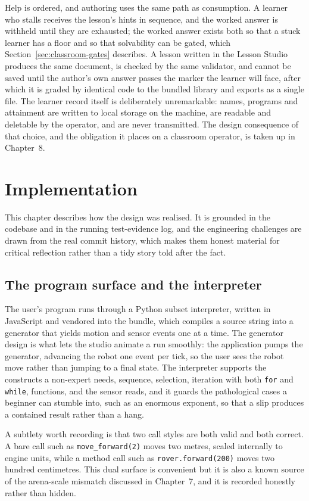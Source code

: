 \documentclass[11pt,a4paper]{report}
\begin{document}
Help is ordered, and authoring uses the same path as consumption. A learner who stalls receives the lesson's hints in sequence, and the worked answer is withheld until they are exhausted; the worked answer exists both so that a stuck learner has a floor and so that solvability can be gated, which Section~\ref{sec:classroom-gates} describes. A lesson written in the Lesson Studio produces the same document, is checked by the same validator, and cannot be saved until the author's own answer passes the marker the learner will face, after which it is graded by identical code to the bundled library and exports as a single file. The learner record itself is deliberately unremarkable: names, programs and attainment are written to local storage on the machine, are readable and deletable by the operator, and are never transmitted. The design consequence of that choice, and the obligation it places on a classroom operator, is taken up in Chapter~8.

\chapter{Implementation}

This chapter describes how the design was realised. It is grounded in the codebase and in the running test-evidence log, and the engineering challenges are drawn from the real commit history, which makes them honest material for critical reflection rather than a tidy story told after the fact.

\section{The program surface and the interpreter}
\label{sec:interp}
The user's program runs through a Python subset interpreter, written in JavaScript and vendored into the bundle, which compiles a source string into a generator that yields motion and sensor events one at a time. The generator design is what lets the studio animate a run smoothly: the application pumps the generator, advancing the robot one event per tick, so the user sees the robot move rather than jumping to a final state. The interpreter supports the constructs a non-expert needs, sequence, selection, iteration with both \texttt{for} and \texttt{while}, functions, and the sensor reads, and it guards the pathological cases a beginner can stumble into, such as an enormous exponent, so that a slip produces a contained result rather than a hang.

A subtlety worth recording is that two call styles are both valid and both correct. A bare call such as \texttt{move\_forward(2)} moves two metres, scaled internally to engine units, while a method call such as \texttt{rover.forward(200)} moves two hundred centimetres. This dual surface is convenient but it is also a known source of the arena-scale mismatch discussed in Chapter~7, and it is recorded honestly rather than hidden.
\end{document}

